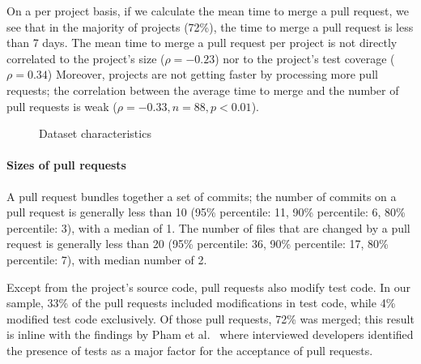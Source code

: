 \documentclass{acm_proc_article-sp}
\begin{document}
On a per project basis, if we calculate the mean time to merge a pull request,
we see that in the majority of projects (72\%), the time to merge a pull
request is less than 7 days. The mean time to merge a pull request per project
is not directly correlated to the project's size ($\rho = -0.23$) nor to the
project's test coverage ($\rho = 0.34$) Moreover, projects are not getting
faster by processing more pull requests; the correlation between the average
time to merge and the number of pull requests is weak ($\rho = -0.33, n =
88, p < 0.01$).

\begin{figure}
\centering
\caption{Dataset characteristics}
\end{figure}

\paragraph*{Sizes of pull requests}

A pull request bundles together a set of commits; the number of 
commits on a pull request is generally less than 10 (95\% percentile: 11,
90\% percentile: 6, 80\% percentile: 3), with a median of 1. The number of 
files that are changed by a pull request is generally less than 20 
(95\% percentile: 36, 90\% percentile: 17, 80\% percentile: 7), with 
median number of 2. 

Except from the project's source code, pull requests also modify test
code. In our sample, 33\% of the pull requests included modifications
in test code, while 4\% modified test code exclusively. Of those
pull requests, 72\% was merged; this result is inline with the findings by
Pham et al.~\cite{Pham13} where interviewed developers identified 
the presence of tests as a major factor for the acceptance of pull requests.
\end{document}

